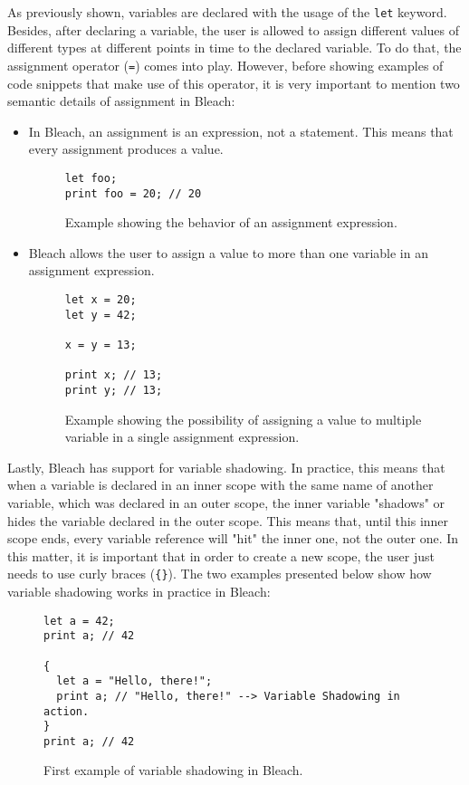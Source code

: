 As previously shown, variables are declared with the usage of the \texttt{let} keyword. Besides, after declaring a variable, the user is allowed to assign different values of different types at different points in time to the declared variable. To do that, the assignment operator (\texttt{=}) comes into play. However, before showing examples of code snippets that make use of this operator, it is very important to mention two semantic details of assignment in Bleach:
\begin{itemize}
    \item In Bleach, an assignment is an expression, not a statement. This means that every assignment produces a value.
    \begin{figure}[H]
        \centering
        \begin{lstlisting}
let foo;
print foo = 20; // 20
        \end{lstlisting}
        \caption{Example showing the behavior of an assignment expression.}
    \end{figure}
    
    \item Bleach allows the user to assign a value to more than one variable in an assignment expression.
    \begin{figure}[H]
        \centering
        \begin{lstlisting}
let x = 20;
let y = 42;

x = y = 13;

print x; // 13;
print y; // 13;
        \end{lstlisting}
        \caption{Example showing the possibility of assigning a value to multiple variable in a single assignment expression.}
    \end{figure}
\end{itemize}

Lastly, Bleach has support for variable shadowing. In practice, this means that when a variable is declared in an inner scope with the same name of another variable, which was declared in an outer scope, the inner variable "shadows" or hides the variable declared in the outer scope. This means that, until this inner scope ends, every variable reference will "hit" the inner one, not the outer one. In this matter, it is important that in order to create a new scope, the user just needs to use curly braces (\texttt{\{\}}). The two examples presented below show how variable shadowing works in practice in Bleach:
\begin{figure}[H]
    \centering
    \begin{lstlisting}
let a = 42;
print a; // 42

{
  let a = "Hello, there!";
  print a; // "Hello, there!" --> Variable Shadowing in action.
}
print a; // 42
    \end{lstlisting}
    \caption{First example of variable shadowing in Bleach.}
\end{figure}

